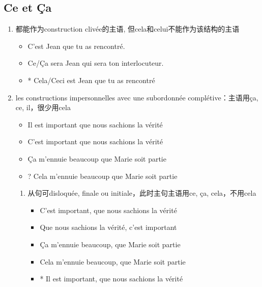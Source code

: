 \documentclass[UTF8]{report}
\begin{document}
\subsection{Ce et Ça}
\begin{enumerate}
    \item 都能作为construction clivée的主语, 但cela和celui不能作为该结构的主语
    \begin{itemize}
        \item C’est Jean que tu as rencontré.
        \item Ce/Ça sera Jean qui sera ton interlocuteur.
        \item * Cela/Ceci est Jean que tu as rencontré
    \end{itemize}
    \item les constructions impersonnelles avec une subordonnée complétive：主语用ça, ce, il，很少用cela
    \begin{itemize}
        \item Il est important que nous sachions la vérité
        \item C’est important que nous sachions la vérité
        \item Ça m’ennuie beaucoup que Marie soit partie
        \item ? Cela m’ennuie beaucoup que Marie soit partie
    \end{itemize}
    \begin{enumerate}
        \item 从句可disloquée, finale ou initiale，此时主句主语用ce, ça, cela，不用cela
        \begin{itemize}
            \item C’est important, que nous sachions la vérité
            \item Que nous sachions la vérité, c’est important
            \item Ça m’ennuie beaucoup, que Marie soit partie
            \item Cela m’ennuie beaucoup, que Marie soit partie
            \item * Il est important, que nous sachions la vérité
        \end{itemize}
    \end{enumerate}
\end{enumerate}
\end{document}
